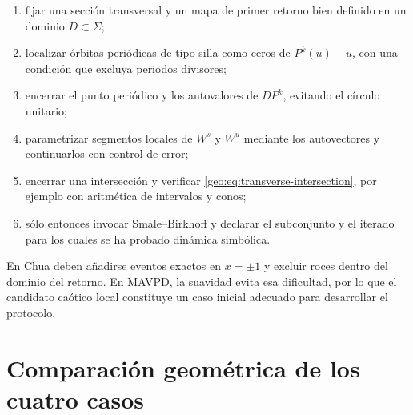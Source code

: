\begin{enumerate}
  \item fijar una sección transversal y un mapa de primer retorno bien
        definido en un dominio \(D\subset\Sigma\);
  \item localizar órbitas periódicas de tipo silla como ceros de
        \(P^k(u)-u\), con una condición que excluya periodos divisores;
  \item encerrar el punto periódico y los autovalores de \(DP^k\), evitando el
        círculo unitario;
  \item parametrizar segmentos locales de \(W^s\) y \(W^u\) mediante los
        autovectores y continuarlos con control de error;
  \item encerrar una intersección y verificar
        \eqref{geo:eq:transverse-intersection}, por ejemplo con aritmética de
        intervalos y conos;
  \item sólo entonces invocar Smale--Birkhoff y declarar el subconjunto y el
        iterado para los cuales se ha probado dinámica simbólica.
\end{enumerate}

En Chua deben añadirse eventos exactos en \(x=\pm1\) y excluir roces dentro
del dominio del retorno. En MAVPD, la suavidad evita esa dificultad, por lo
que el candidato caótico local constituye un caso inicial adecuado para
desarrollar el protocolo.

\section{Comparación geométrica de los cuatro casos}
\label{sec:geo-four-cases}

